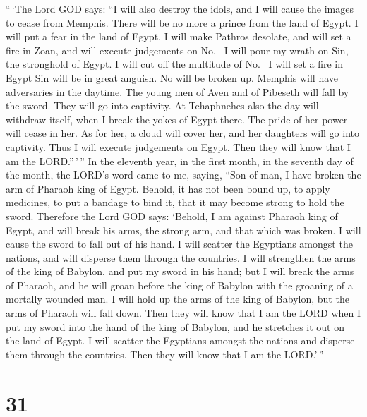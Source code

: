  ``\,`The Lord GOD says: ``I will also destroy the idols,
and I will cause the images to cease from Memphis. There will be no more
a prince from the land of Egypt. I will put a fear in the land of Egypt.
 I will make Pathros desolate, and will set a fire in Zoan,
and will execute judgements on No.~ I will pour my wrath on
Sin, the stronghold of Egypt. I will cut off the multitude of
No.~ I will set a fire in Egypt Sin will be in great
anguish. No will be broken up. Memphis will have adversaries in the
daytime.  The young men of Aven and of Pibeseth will fall
by the sword. They will go into captivity.  At Tehaphnehes
also the day will withdraw itself, when I break the yokes of Egypt
there. The pride of her power will cease in her. As for her, a cloud
will cover her, and her daughters will go into captivity. 
Thus I will execute judgements on Egypt. Then they will know that I am
the LORD.''\,'\,''  In the eleventh year, in the first
month, in the seventh day of the month, the LORD's word came to me,
saying,  ``Son of man, I have broken the arm of Pharaoh
king of Egypt. Behold, it has not been bound up, to apply medicines, to
put a bandage to bind it, that it may become strong to hold the sword.
 Therefore the Lord GOD says: `Behold, I am against Pharaoh
king of Egypt, and will break his arms, the strong arm, and that which
was broken. I will cause the sword to fall out of his hand.
 I will scatter the Egyptians amongst the nations, and will
disperse them through the countries.  I will strengthen the
arms of the king of Babylon, and put my sword in his hand; but I will
break the arms of Pharaoh, and he will groan before the king of Babylon
with the groaning of a mortally wounded man.  I will hold
up the arms of the king of Babylon, but the arms of Pharaoh will fall
down. Then they will know that I am the LORD when I put my sword into
the hand of the king of Babylon, and he stretches it out on the land of
Egypt.  I will scatter the Egyptians amongst the nations
and disperse them through the countries. Then they will know that I am
the LORD.'\,''

\hypertarget{section-29}{%
\section{31}\label{section-29}}

